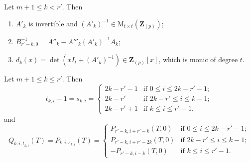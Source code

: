 \documentclass[10pt,a4paper]{amsart}
\newcommand{\M}{\mathrm{M}}
\newcommand{\Z}{\mathbf{Z}}
\begin{document}
\begin{lemm}\label{lemma-QAinv}
Let $m+1\leq k<r'$. Then
    \begin{enumerate}[leftmargin=*]
      \item $A'_k$ is invertible and $(A'_k)^{-1}\in\M_{t\times t}(\Z_{(p)})$;
      \item $B_{r'-k,0}^{-1}=A''_k-A'''_k(A'_k)^{-1}A_k$;
      \item $d_k(x)=\det(xI_t+(A'_k)^{-1})\in \Z_{(p)}[x]$, which is monic of degree $t$.
    \end{enumerate}
\end{lemm}

\begin{lemm}\label{lemma: m+1 to r}
    Let $m+1\leq k\leq r'$. Then
    \begin{equation*}
       t_{k,i}-1= s_{k,i}=
        \begin{cases}
            2k-r'-1 & \mbox{if } 0\leq i\leq 2k-r'-1; \\
            2k-r' & \mbox{if } 2k-r'\leq i\leq k-1;\\
            2k-r'+1 & \mbox{if } k\leq i\leq r'-1,
        \end{cases}
    \end{equation*}
    and
    \begin{equation*}
       Q_{k,i,t_{k,i}}(T)= P_{k,i,s_{k,i}}(T)
        =
        \begin{cases}
            P_{r'-k,i+r'-k}(T,0) & \mbox{if } 0\leq i\leq 2k-r'-1; \\
            P_{r'-k, i+r'-2k}(T,0) & \mbox{if } 2k-r'\leq i\leq k-1;\\
            -P_{r'-k,i-k}(T,0) & \mbox{if } k\leq i\leq r'-1.
        \end{cases}
    \end{equation*}
\end{lemm}
\end{document}
